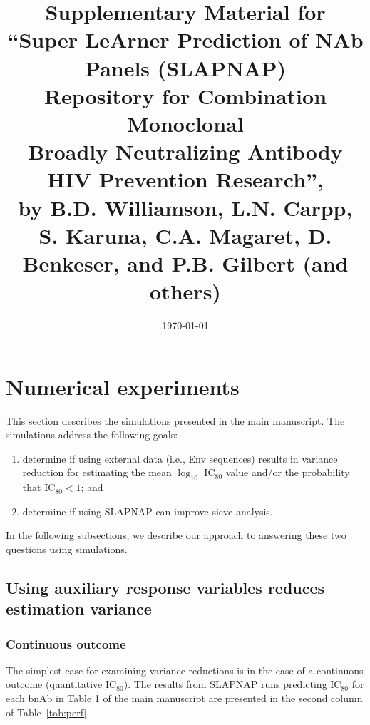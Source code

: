 \documentclass[10pt]{article}
\title{Supplementary Material for \\
``Super LeArner Prediction of NAb Panels (SLAPNAP) \\ Repository for Combination Monoclonal \\
Broadly Neutralizing Antibody HIV Prevention Research'', \\
by B.D. Williamson, L.N. Carpp, S. Karuna, C.A. Magaret, D. Benkeser, and P.B. Gilbert (and others)}
\date{\today}
\begin{document}
\maketitle

\section{Numerical experiments}

This section describes the simulations presented in the main manuscript. The simulations address the following goals:
\begin{enumerate}
    \item determine if using external data (i.e., Env sequences) results in variance reduction for estimating the mean $\log_{10}$ IC$_{80}$ value and/or the probability that IC$_{80} < 1$; and
    \item determine if using SLAPNAP can improve sieve analysis.
\end{enumerate}
In the following subsections, we describe our approach to answering these two questions using simulations.

\subsection{Using auxiliary response variables reduces estimation variance}
\subsubsection{Continuous outcome}
The simplest case for examining variance reductions is in the case of a continuous outcome (quantitative IC$_{80}$). The results from SLAPNAP runs predicting IC$_{80}$ for each bnAb in Table 1 of the main manuscript are presented in the second column of Table~\ref{tab:perf}.
\end{document}
